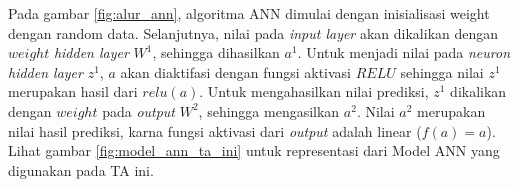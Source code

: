   Pada gambar \ref{fig:alur_ann}, algoritma ANN dimulai dengan inisialisasi weight dengan random data. Selanjutnya, nilai pada \emph{input layer} akan dikalikan dengan $weight$ \emph{hidden layer} $W^1$, sehingga dihasilkan $a^1$. Untuk menjadi nilai pada \emph{neuron hidden layer} $z^1$, $a$ akan diaktifasi dengan fungsi aktivasi $RELU$ sehingga nilai $z^1$ merupakan hasil dari $relu(a)$. Untuk mengahasilkan nilai prediksi, $z^1$ dikalikan dengan $weight$ pada \emph{output} $W^2$, sehingga mengasilkan $a^2$. Nilai $a^2$ merupakan nilai hasil prediksi, karna fungsi aktivasi dari \emph{output} adalah linear ($f(a) = a$). Lihat gambar \ref{fig:model_ann_ta_ini} untuk representasi dari Model ANN yang digunakan pada TA ini.

\FloatBarrier
